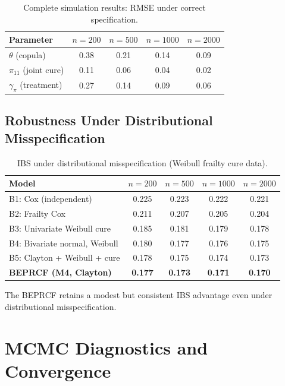 \documentclass[12pt,a4paper]{article}
\begin{document}
\begin{table}[H]
\centering
\caption{Complete simulation results: RMSE under correct specification.}
\label{tab:S5b}
\begin{tabular}{lcccc}
\toprule
\textbf{Parameter} & $n = 200$ & $n = 500$ & $n = 1000$ & $n = 2000$ \\
\midrule
$\theta$ (copula) & 0.38 & 0.21 & 0.14 & 0.09 \\
$\pi_{11}$ (joint cure) & 0.11 & 0.06 & 0.04 & 0.02 \\
$\gamma_\pi$ (treatment) & 0.27 & 0.14 & 0.09 & 0.06 \\
\bottomrule
\end{tabular}
\end{table}

\subsection{Robustness Under Distributional Misspecification}

\begin{table}[H]
\centering
\caption{IBS under distributional misspecification (Weibull frailty cure data).}
\label{tab:S6}
\begin{tabular}{lcccc}
\toprule
\textbf{Model} & $n = 200$ & $n = 500$ & $n = 1000$ & $n = 2000$ \\
\midrule
B1: Cox (independent) & 0.225 & 0.223 & 0.222 & 0.221 \\
B2: Frailty Cox & 0.211 & 0.207 & 0.205 & 0.204 \\
B3: Univariate Weibull cure & 0.185 & 0.181 & 0.179 & 0.178 \\
B4: Bivariate normal, Weibull & 0.180 & 0.177 & 0.176 & 0.175 \\
B5: Clayton + Weibull + cure & 0.178 & 0.175 & 0.174 & 0.173 \\
\textbf{BEPRCF (M4, Clayton)} & \textbf{0.177} & \textbf{0.173} & \textbf{0.171} & \textbf{0.170} \\
\bottomrule
\end{tabular}
\end{table}

The BEPRCF retains a modest but consistent IBS advantage even under distributional misspecification.

\section{MCMC Diagnostics and Convergence}
\end{document}
